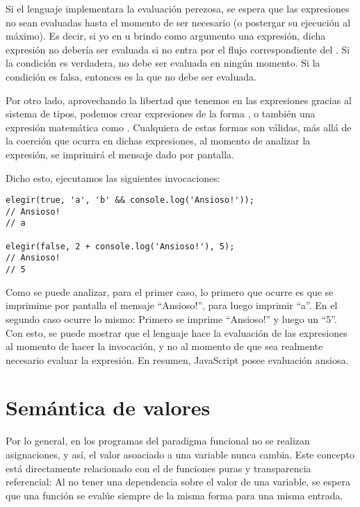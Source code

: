Si el lenguaje implementara la evaluación perezosa, se espera que las expresiones no sean evaluadas hasta el momento de ser necesario (o postergar su ejecución al máximo). Es decir, si yo en  u  brindo como argumento una expresión, dicha expresión no debería ser evaluada si no entra por el flujo correspondiente del . Si la condición es verdadera,  no debe ser evaluada en ningún momento. Si la condición es falsa, entonces es  la que no debe ser evaluada.

Por otro lado, aprovechando la libertad que tenemos en las expresiones gracias al sistema de tipos, podemos crear expresiones de la forma , o también una expresión matemática como . Cualquiera de estas formas son válidas, más allá de la coerción que ocurra en dichas expresiones, al momento de analizar la expresión, se imprimirá el mensaje dado por pantalla.

Dicho esto, ejecutamos las siguientes invocaciones:

\begin{lstlisting}[title={Analizando resultados de las invocaciones}]
elegir(true, 'a', 'b' && console.log('Ansioso!'));
// Ansioso!
// a

elegir(false, 2 + console.log('Ansioso!'), 5);
// Ansioso!
// 5
\end{lstlisting}

Como se puede analizar, para el primer caso, lo primero que ocurre es que se imprimime por pantalla el mensaje "`Ansioso!"', para luego imprimir "`a"'. En el segundo caso ocurre lo mismo: Primero se imprime "`Ansioso!"' y luego un "`5"'. Con esto, se puede mostrar que el lenguaje hace la evaluación de las expresiones al momento de hacer la invocación, y no al momento de que sea realmente necesario evaluar la expresión. En resumen, JavaScript posee evaluación ansiosa.

\section{Semántica de valores}

Por lo general, en los programas del paradigma funcional no se realizan asignaciones, y así, el valor asoaciado a una variable nunca cambia. Este concepto está directamente relacionado con el de funciones puras y transparencia referencial: Al no tener una dependencia sobre el valor de una variable, se espera que una función se evalúe siempre de la misma forma para una misma entrada.

